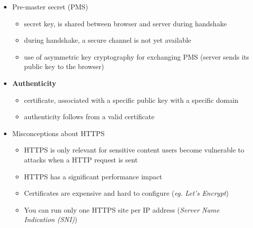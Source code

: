 \documentclass[12pt,titlepage,a4paper]{report}
\begin{document}
\begin{itemize}
				\item Pre-master secret (PMS)
				\begin{itemize}
					\item secret key, is shared between browser and server during handshake
					\item during handshake, a secure channel is not yet available
					\item use of asymmetric key cryptography for exchanging PMS (server sends its public key to the browser)
				\end{itemize}
			
				\item \textbf{Authenticity}
				\begin{itemize}
					\item certificate, associated with a specific public key with a specific domain
					\item authenticity follows from a valid certificate
				\end{itemize}
			
				\item Misconceptions about HTTPS
				\begin{itemize}
					\item HTTPS is only relevant for sensitive content 
						\subitem users become vulnerable to attacks when a HTTP request is sent
					\item HTTPS has a significant performance impact
					\item Certificates are expensive and hard to configure (\emph{eg. Let's Encrypt})
					\item You can run only one HTTPS site per IP address (\emph{Server Name Indication (SNI)})
				\end{itemize}
			\end{itemize}
\end{document}

